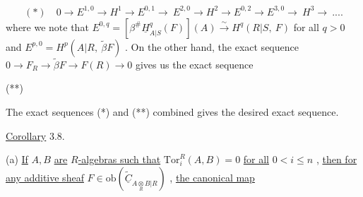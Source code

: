 \begin{equation*}
(*)\quad 0 \to E^{1,0} \to H^{1} \to E^{0,1}\!\to\ E^{2,0} \to H^{2} \to E^{0,2} \to E^{3,0}\!\to\ H^{3} \to\ ....
\end{equation*}
where we note that  $E^{0,q} = [\beta^{\#}\underline{H}^{q}_{A|S}(F)](A) \overset{\sim}{\to} H^{q}(R|S,\ F)$  for all  $q > 0$  and $E^{p,0} = H^{p}(A|R,\ \widetilde{\beta}F)$ . On the other hand, the exact sequence  $0 \to F_{R} \to \widetilde{\beta}F \to F(R) \to 0$ gives us the exact sequence

(**)\quad{}
The exact sequences (*) and (**) combined gives the desired exact sequence.



\underline{Corollary} 3.8.

(a)  \underline{If}  $A, B$  \underline{are} $R$\underline{-algebras such that}  $\mathrm{Tor}^{R}_{i}(A, B) = 0$  \underline{for all} $0 < i \leq n$  , \underline{then for any additive sheaf}  $F \in \mathrm{ob}(\widetilde{\underline{C}}_{A\underset{R}{\otimes}B|R})$  , \underline{the canonical map}

